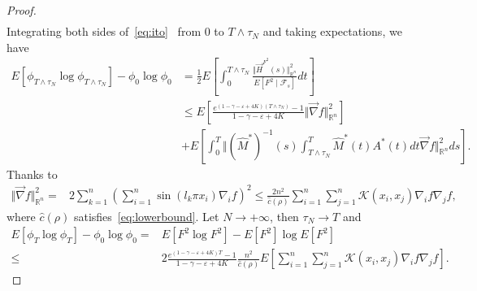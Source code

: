 \documentclass[11pt]{article}
\numberwithin{equation}{section}%
\numberwithin{figure}{section}%
\theoremstyle{remark}
\begin{document}
\begin{proof}
\begin{align*}
		\end{align*}
		Integrating both sides of~\eqref{eq:ito}~ from 0 to $T\wedge\tau_{N}$ and taking expectations, we have
		\begin{align*}
			E[\phi_{T\wedge\tau_{N}}\log\phi_{T\wedge\tau_{N}}]-\phi_{0}\log\phi_{0}&=\frac{1}{2}E[\int_{0}^{T\wedge\tau_{N}}\frac{\Vert \vec{H}^{F^{2}}(s)\Vert^{2}_{\mathbb{R}^{n}}}{E[F^{2}\mid \mathcal{F}_{s}]}dt]\\
			&\leq E\left[\frac{e^{(1-\gamma-\varepsilon+4K)(T\wedge\tau_{N})}-1}{1-\gamma-\varepsilon+4K}\Vert \vec{\nabla}f\Vert^{2}_{\mathbb{R}^{n}}\right]\\
			&+E\left[\int_{0}^{T}\Vert(\hat{M}^{*})^{-1}(s)\int_{T\wedge\tau_{N}}^{T}\hat{M}^{*}(t)A^{*}(t)dt\vec{\nabla}f\Vert^{2}_{\mathbb{R}^{n}}ds\right].
		\end{align*}
		Thanks to
		\begin{align*}
			\Vert \vec{\nabla}f\Vert^{2}_{\mathbb{R}^{n}}=&2 \sum_{k=1}^{n}\left(\sum_{i=1}^{n}\sin(l_{k}\pi x_{i})\nabla_{i} f\right)^{2}
			\leq\frac{2n^{2}}{\hat{c}(\rho)}\sum_{i=1}^{n}\sum_{j=1}^{n}\mathcal{K}(x_{i},x_{j})\nabla_{i} f\nabla_{j} f,
		\end{align*}
		where $\hat{c}(\rho)$ satisfies~\eqref{eq:lowerbound}.
	Let $N\rightarrow+\infty$, then $\tau_{N}\rightarrow T$ and
		\begin{align*}
			E[\phi_{T}\log\phi_{T}]-\phi_{0}\log\phi_{0}=&E[F^{2}\log F^{2}]-E[F^{2}]\log E[F^{2}]\\
			\leq&2\frac{e^{(1-\gamma-\varepsilon+4K)T}-1}{1-\gamma-\varepsilon+4K}\frac{n^{2}}{\hat{c}(\rho)}E\left[\sum_{i=1}^{n}\sum_{j=1}^{n}\mathcal{K}(x_{i},x_{j})\nabla_{i}f\nabla_{j}f\right].
		\end{align*}

	\end{proof}
	
\end{document}
